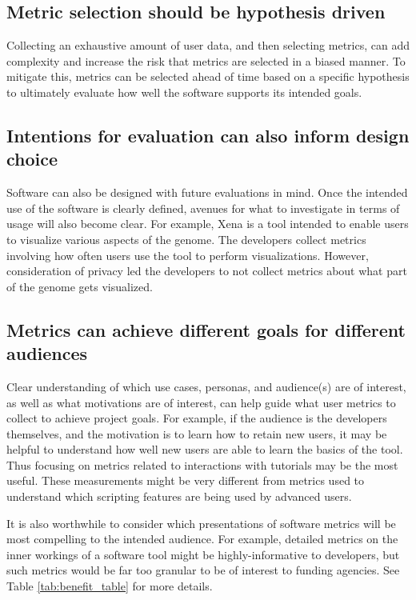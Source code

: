 \documentclass{article}
\begin{document}
\subsection{Metric selection should be hypothesis driven} 
\label{sec:hypothesis_driven}
Collecting an exhaustive amount of user data, and then selecting metrics, can add complexity and increase the risk that metrics are selected in a biased manner. To mitigate this, metrics can be selected ahead of time based on a specific hypothesis to ultimately evaluate how well the software supports its intended goals. 


\subsection{Intentions for evaluation can also inform design choice} Software can also be designed with future evaluations in mind. Once the intended use of the software is clearly defined, avenues for what to investigate in terms of usage will also become clear. For example, Xena \cite{xena_2020} is a tool intended to enable users to visualize various aspects of the genome. The developers collect metrics involving how often users use the tool to perform  visualizations. However, consideration of privacy led the developers to not collect metrics about what part of the genome gets visualized. 




\subsection{Metrics can achieve different goals for different audiences}

Clear understanding of which use cases, personas, and audience(s) are of interest, as well as what motivations are of interest, can help guide what user metrics to collect to achieve project goals.  For example, if the audience is the developers themselves, and the motivation is to learn how to retain new users, it may be helpful to understand how well new users are able to learn the basics of the tool. Thus focusing on metrics related to interactions with tutorials may be the most useful. These measurements might be very different from metrics used to understand which scripting features are being used by advanced users. 

It is also worthwhile to consider which presentations of software metrics will be most compelling to the intended audience. For example, detailed metrics on the inner workings of a software tool might be highly-informative to developers, but such metrics would be far too granular to be of interest to funding agencies.  See Table \ref{tab:benefit_table} for more details.
 
\end{document}
